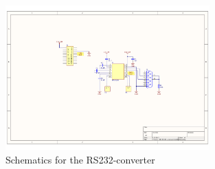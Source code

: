\begin{figure}
	\begin{center}
		\includegraphics[width=0.7\textwidth, trim=360 220 190 180, clip=true]{../Schematics/RPI-RS232-schematic.pdf}
	\end{center}
	\caption{Schematics for the RS232-converter}
	\label{fig:UART-RS232}
\end{figure}
